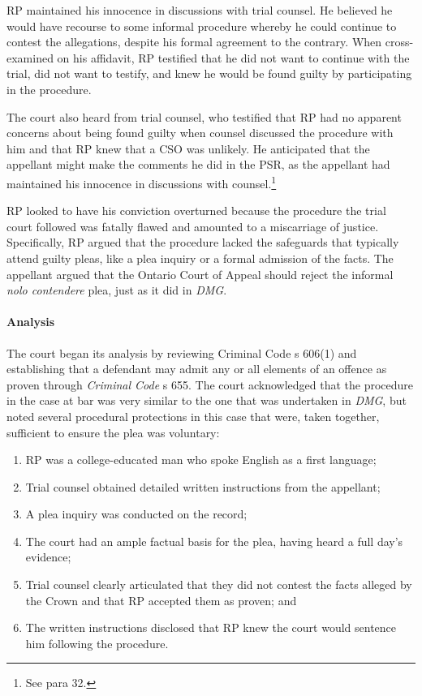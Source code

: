 RP maintained his innocence in discussions with trial counsel. He believed he would have recourse to some informal procedure whereby he could continue to contest the allegations, despite his formal agreement to the contrary. When cross-examined on his affidavit, RP testified that he did not want to continue with the trial, did not want to testify, and knew he would be found guilty by participating in the procedure.

The court also heard from trial counsel, who testified that RP had no apparent concerns about being found guilty when counsel discussed the procedure with him and that RP knew that a CSO was unlikely. He anticipated that the appellant might make the comments he did in the PSR, as the appellant had maintained his innocence in discussions with counsel.\footnote{See para 32.}

RP looked to have his conviction overturned because the procedure the trial court followed was fatally flawed and amounted to a miscarriage of justice. Specifically, RP argued that the procedure lacked the safeguards that typically attend guilty pleas, like a plea inquiry or a formal admission of the facts. The appellant argued that the Ontario Court of Appeal should reject the informal \textit{nolo contendere} plea, just as it did in \textit{DMG}.

\paragraph{Analysis\\}

The court began its analysis by reviewing Criminal Code s 606(1) and establishing that a defendant may admit any or all elements of an offence as proven through \textit{Criminal Code} s 655. The court acknowledged that the procedure in the case at bar was very similar to the one that was undertaken in \textit{DMG}, but noted several procedural protections in this case that were, taken together, sufficient to ensure the plea was voluntary:

\begin{enumerate}
    \item RP was a college-educated man who spoke English as a first language; 
    \item Trial counsel obtained detailed written instructions from the appellant;
    \item A plea inquiry was conducted on the record;
    \item The court had an ample factual basis for the plea, having heard a full day's evidence;
    \item Trial counsel clearly articulated that they did not contest the facts alleged by the Crown and that RP accepted them as proven; and
    \item The written instructions disclosed that RP knew the court would sentence him following the procedure.
\end{enumerate}

